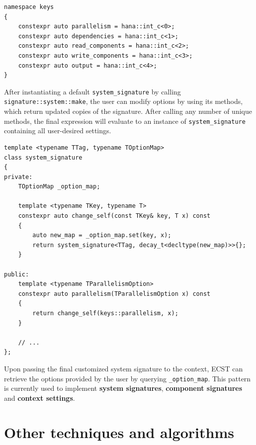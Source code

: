 \documentclass[oneside, 12pt, a4paper, openany]{book}
\begin{document}
\begin{verbatim}
namespace keys
{
    constexpr auto parallelism = hana::int_c<0>;
    constexpr auto dependencies = hana::int_c<1>;
    constexpr auto read_components = hana::int_c<2>;
    constexpr auto write_components = hana::int_c<3>;
    constexpr auto output = hana::int_c<4>;
}
\end{verbatim}

After instantiating a default
\texttt{system_signature}
by calling
\texttt{signature::system::make},
the user can modify options by using its methods, which return updated
copies of the signature. After calling any number of unique methods, the
final expression will evaluate to an instance of
\texttt{system_signature}
containing all user-desired settings.

\begin{verbatim}
template <typename TTag, typename TOptionMap>
class system_signature
{
private:
    TOptionMap _option_map;

    template <typename TKey, typename T>
    constexpr auto change_self(const TKey& key, T x) const
    {
        auto new_map = _option_map.set(key, x);
        return system_signature<TTag, decay_t<decltype(new_map)>>{};
    }

public:
    template <typename TParallelismOption>
    constexpr auto parallelism(TParallelismOption x) const
    {
        return change_self(keys::parallelism, x);
    }

    // ...
};
\end{verbatim}

Upon passing the final customized system signature to the context, ECST
can retrieve the options provided by the user by querying
\texttt{_option_map}.
This pattern is currently used to implement \textbf{system signatures},
\textbf{component signatures} and \textbf{context settings}.

\section{Other techniques and
algorithms}\label{other-techniques-and-algorithms}
\end{document}
